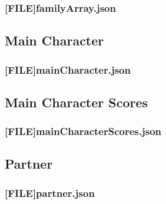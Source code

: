 \subsubsection{[FILE]familyArray.json}


\subsection{Main Character}
\subsubsection{[FILE]mainCharacter.json}


\subsection{Main Character Scores}
\subsubsection{[FILE]mainCharacterScores.json}


\subsection{Partner}
\subsubsection{[FILE]partner.json}
